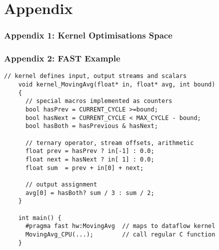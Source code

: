 \section{Appendix}
\begin{frame}[fragile]
  \frametitle{Appendix 1: Kernel Optimisations Space}
  \begin{figure}[!ht]
    \centering
    \def\svgwidth{\linewidth}
    
  \end{figure}
\end{frame}


\begin{frame}[fragile]
  \frametitle{Appendix 2: FAST Example}

  \begin{lstlisting}[style=MaxC,   basicstyle=\scriptsize]
    // kernel defines input, output streams and scalars
    void kernel_MovingAvg(float* in, float* avg, int bound)
    {
      // special macros implemented as counters
      bool hasPrev = CURRENT_CYCLE >=bound;
      bool hasNext = CURRENT_CYCLE < MAX_CYCLE - bound;
      bool hasBoth = hasPrevious & hasNext;

      // ternary operator, stream offsets, arithmetic
      float prev = hasPrev ? in[-1] : 0.0;
      float next = hasNext ? in[ 1] : 0.0;
      float sum  = prev + in[0] + next;

      // output assignment
      avg[0] = hasBoth? sum / 3 : sum / 2;
    }

    int main() {
      #pragma fast hw:MovingAvg  // maps to dataflow kernel
      MovingAvg_CPU(...);        // call regular C function
    }
  \end{lstlisting}
\end{frame}

